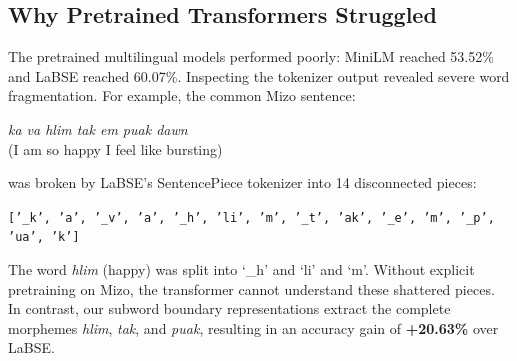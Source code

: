 \documentclass[conference]{IEEEtran}
\begin{document}
\begin{table}[htbp]
\caption{Model Performance on the Unseen Mizo Test Partition}
\label{tab:model_comparison}
\centering
{}
\end{table}

\subsection{Why Pretrained Transformers Struggled}
The pretrained multilingual models performed poorly: MiniLM reached 53.52\% and LaBSE reached 60.07\%. Inspecting the tokenizer output revealed severe word fragmentation. For example, the common Mizo sentence:
\begin{center}
\textit{ka va hlim tak em puak dawn} \\
(I am so happy I feel like bursting)
\end{center}
was broken by LaBSE's SentencePiece tokenizer into 14 disconnected pieces:
\begin{center}
\texttt{['\_k', 'a', '\_v', 'a', '\_h', 'li', 'm', '\_t', 'ak', '\_e', 'm', '\_p', 'ua', 'k']}
\end{center}
The word \textit{hlim} (happy) was split into `\_h' and `li' and `m'. Without explicit pretraining on Mizo, the transformer cannot understand these shattered pieces. In contrast, our subword boundary representations extract the complete morphemes \textit{hlim}, \textit{tak}, and \textit{puak}, resulting in an accuracy gain of \textbf{+20.63\%} over LaBSE.
\end{document}
